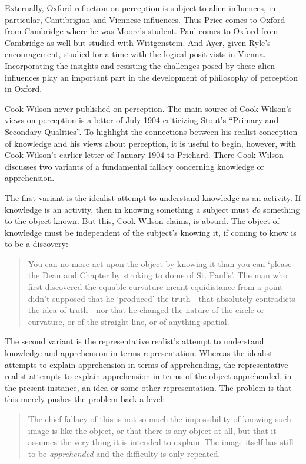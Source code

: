 \documentclass[11pt]{article}
\begin{document}
Externally, Oxford reflection on perception is subject to alien influences, in particular, Cantibrigian and Viennese influences. Thus Price comes to Oxford from Cambridge where he was Moore's student. Paul comes to Oxford from Cambridge as well but studied with Wittgenstein. And Ayer, given Ryle's encouragement, studied for a time with the logical positivists in Vienna. Incorporating the insights and resisting the challenges posed by these alien influences play an important part in the development of philosophy of perception in Oxford.

Cook Wilson never published on perception. The main source of Cook Wilson's \citeyear{Cook-Wilson:1926sf} views on perception is a letter of July 1904 criticizing Stout's \citeyear{Stout:1903zl} ``Primary and Secondary Qualities''. To highlight the connections between his realist conception of knowledge and his views about perception, it is useful to begin, however, with Cook Wilson's \citeyear{Cook-Wilson:1926sf} earlier letter of January 1904 to Prichard. There Cook Wilson discusses two variants of a fundamental fallacy concerning knowledge or apprehension.

The first variant is the idealist attempt to understand knowledge as an activity. If knowledge is an activity, then in knowing something a subject must \emph{do} something to the object known. But this, Cook Wilson claims, is absurd. The object of knowledge must be independent of the subject's knowing it, if coming to know is to be a discovery: 
\begin{quote}
	You can no more act upon the object by knowing it than you can `please the Dean and Chapter by stroking to dome of St. Paul's'. The man who first discovered the equable curvature meant equidistance from a point didn't supposed that he `produced' the truth---that absolutely contradicts the idea of truth---nor that he changed the nature of the circle or curvature, or of the straight line, or of anything spatial. \citep[]{Cook-Wilson:1926sf}
\end{quote}

The second variant is the representative realist's attempt to understand knowledge and apprehension in terms representation. Whereas the idealist attempts to explain apprehension in terms of apprehending, the representative realist attempts to explain apprehension in terms of the object apprehended, in the present instance, an idea or some other representation. The problem is that this merely pushes the problem back a level:
\begin{quote}
	The chief fallacy of this is not so much the impossibility of knowing such image is like the object, or that there is any object at all, but that it assumes the very thing it is intended to explain. The image itself has still to be \emph{apprehended} and the difficulty is only repeated. \citep[]{Cook-Wilson:1926sf}
\end{quote}
\end{document}
